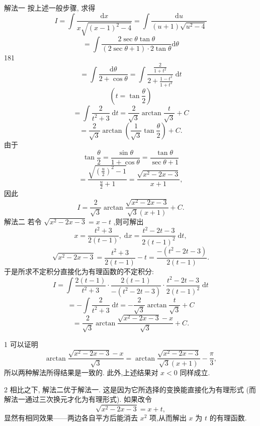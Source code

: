 \begin{solution}

\end{solution}
解法一 按上述一般步骤, 求得
\[
I = \int \frac{\mathrm{d}x}{x\sqrt{{\left( x - 1\right) }^{2} - 4}} = \int \frac{\mathrm{d}u}{\left( {u + 1}\right) \sqrt{{u}^{2} - 4}}
\]
\[
= \int \frac{2\sec \theta \tan \theta }{\left( {2\sec \theta  + 1}\right)  \cdot  2\tan \theta }\mathrm{d}\theta
\]
181
\[
= \int \frac{\mathrm{d}\theta }{2 + \cos \theta } = \int \frac{\frac{2}{1 + {t}^{2}}}{2 + \frac{1 - {t}^{2}}{1 + {t}^{2}}}\mathrm{\;d}t
\]
\[
\left( {t = \tan \frac{\theta }{2}}\right)
\]
\[
= \int \frac{2}{{t}^{2} + 3}\mathrm{\;d}t = \frac{2}{\sqrt{3}}\arctan \frac{t}{\sqrt{3}} + C
\]
\[
= \frac{2}{\sqrt{3}}\arctan \left( {\frac{1}{\sqrt{3}}\tan \frac{\theta }{2}}\right)  + C.
\]
由于
\[
\tan \frac{\theta }{2} = \frac{\sin \theta }{1 + \cos \theta } = \frac{\tan \theta }{\sec \theta  + 1}
\]
\[
= \frac{\sqrt{{\left( \frac{u}{2}\right) }^{2} - 1}}{\frac{u}{2} + 1} = \frac{\sqrt{{x}^{2} - {2x} - 3}}{x + 1},
\]
因此
\[
I = \frac{2}{\sqrt{3}}\arctan \frac{\sqrt{{x}^{2} - {2x} - 3}}{\sqrt{3}\left( {x + 1}\right) } + C.
\]
解法二 若令 \(\sqrt{{x}^{2} - {2x} - 3} = x - t\) ,则可解出
\[
x = \frac{{t}^{2} + 3}{2\left( {t - 1}\right) },\;\mathrm{d}x = \frac{{t}^{2} - {2t} - 3}{2{\left( t - 1\right) }^{2}}\mathrm{\;d}t,
\]
\[
\sqrt{{x}^{2} - {2x} - 3} = \frac{{t}^{2} + 3}{2\left( {t - 1}\right) } - t = \frac{-\left( {{t}^{2} - {2t} - 3}\right) }{2\left( {t - 1}\right) }.
\]
于是所求不定积分直接化为有理函数的不定积分:
\[
I = \int \frac{2\left( {t - 1}\right) }{{t}^{2} + 3} \cdot  \frac{2\left( {t - 1}\right) }{-\left( {{t}^{2} - {2t} - 3}\right) } \cdot  \frac{{t}^{2} - {2t} - 3}{2{\left( t - 1\right) }^{2}}\mathrm{\;d}t
\]
\[
=  - \int \frac{2}{{t}^{2} + 3}\mathrm{\;d}t =  - \frac{2}{\sqrt{3}}\arctan \frac{t}{\sqrt{3}} + C
\]
\[
= \frac{2}{\sqrt{3}}\arctan \frac{\sqrt{{x}^{2} - {2x} - 3} - x}{\sqrt{3}} + C.
\]
\begin{remark}

\end{remark}
1 可以证明
\[
\arctan \frac{\sqrt{{x}^{2} - {2x} - 3} - x}{\sqrt{3}} = \arctan \frac{\sqrt{{x}^{2} - {2x} - 3}}{\sqrt{3}\left( {x + 1}\right) } - \frac{\pi }{3},
\]
所以两种解法所得结果是一致的. 此外,上述结果对 \(x < 0\) 同样成立.

\begin{remark}

\end{remark}
2 相比之下, 解法二优于解法一. 这是因为它所选择的变换能直接化为有理形式 (而解法一通过三次换元才化为有理形式). 如果改令
\[
\sqrt{{x}^{2} - {2x} - 3} = x + t,
\]
显然有相同效果——两边各自平方后能消去 \({x}^{2}\) 项,从而解出 \(x\) 为 \(t\) 的有理函数.

